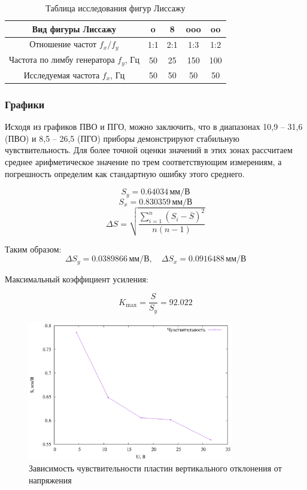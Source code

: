 \begin{table}[h!]
\centering
\label{tabl:4}
\caption{Таблица исследования фигур Лиссажу}
\begin{tabular}{|c|c|c|c|c|}
\hline
Вид фигуры Лиссажу & o & 8 & ooo & oo \\
\hline
Отношение частот \( f_x/f_y \) & 1:1 & 2:1 & 1:3 & 1:2 \\
\hline
Частота по лимбу генератора \( f_y \), Гц & 50 & 25 & 150 & 100 \\
\hline
Исследуемая частота \( f_x \), Гц & 50 & 50 & 50 & 50 \\
\hline
\end{tabular}
\end{table}

\subsubsection{Графики}


Исходя из графиков ПВО и ПГО, можно заключить, что в диапазонах 10,9 – 31,6 (ПВО) и 8,5 – 26,5 (ПГО) приборы демонстрируют стабильную чувствительность. Для более точной оценки значений в этих зонах рассчитаем среднее арифметическое значение по трем соответствующим измерениям, а погрешность определим как стандартную ошибку этого среднего.

\[
S_y = 0.64034\, \text{мм/В}
\]
\[
S_x = 0.830359 \, \text{мм/В}
\]
\[
\Delta S = \sqrt{\frac{\sum_{i=1}^{n} (S_i - \overline{S})^2}{n(n-1)}}
\]

Таким образом:
\[
\Delta S_y = 0.0389866 \, \text{мм/В}, \quad \Delta S_x = 0.0916488 \, \text{мм/В}
\]

Максимальный коэффициент усиления:

\[
K_{\text{max}} = \frac{S}{S_y} = 92.022
\]
\clearpage
\begin{figure}[ht!]
\centering
\includegraphics[width=0.8\textwidth]{sensitivity_vs_voltage.eps}
\caption{Зависимость чувствительности пластин вертикального отклонения от напряжения}
\label{fig:plot}
\end{figure}


